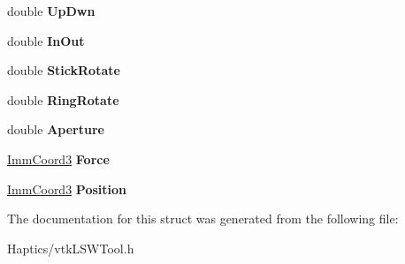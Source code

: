 \begin{DoxyCompactItemize}
\item 
\hypertarget{structvtkLSWDataTool_a6ace25d794dde324d8b1f1e1ddb65cb0}{
double {\bfseries UpDwn}}
\label{structvtkLSWDataTool_a6ace25d794dde324d8b1f1e1ddb65cb0}

\item 
\hypertarget{structvtkLSWDataTool_a6761ea9113b6def7f65e31420603a906}{
double {\bfseries InOut}}
\label{structvtkLSWDataTool_a6761ea9113b6def7f65e31420603a906}

\item 
\hypertarget{structvtkLSWDataTool_a43800f23a0365fe72a6d45aa6bd49388}{
double {\bfseries StickRotate}}
\label{structvtkLSWDataTool_a43800f23a0365fe72a6d45aa6bd49388}

\item 
\hypertarget{structvtkLSWDataTool_a1c56015f4a2757b0b9fc313a57f58962}{
double {\bfseries RingRotate}}
\label{structvtkLSWDataTool_a1c56015f4a2757b0b9fc313a57f58962}

\item 
\hypertarget{structvtkLSWDataTool_a72d7e48f75dd6b3ac922b00c37cb185a}{
double {\bfseries Aperture}}
\label{structvtkLSWDataTool_a72d7e48f75dd6b3ac922b00c37cb185a}

\item 
\hypertarget{structvtkLSWDataTool_a75485de999decec27f625fa0182e1723}{
\hyperlink{structImmCoord3}{ImmCoord3} {\bfseries Force}}
\label{structvtkLSWDataTool_a75485de999decec27f625fa0182e1723}

\item 
\hypertarget{structvtkLSWDataTool_ad6f2ed43866f2bde17079ac1f35824ce}{
\hyperlink{structImmCoord3}{ImmCoord3} {\bfseries Position}}
\label{structvtkLSWDataTool_ad6f2ed43866f2bde17079ac1f35824ce}

\end{DoxyCompactItemize}


The documentation for this struct was generated from the following file:\begin{DoxyCompactItemize}
\item 
Haptics/vtkLSWTool.h\end{DoxyCompactItemize}
